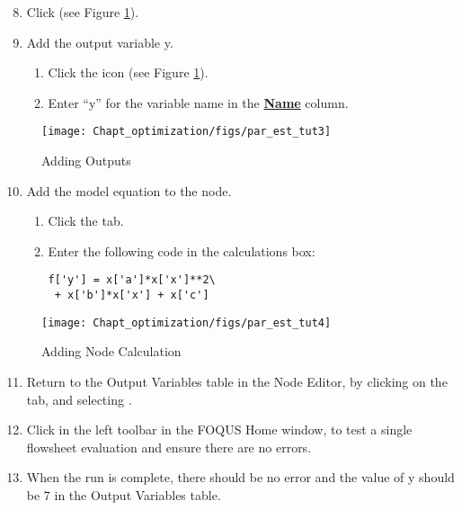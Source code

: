 \begin{enumerate}
	\setcounter{enumi}{7}
	\item Click  (see Figure \ref{fig.pe.tut3}).
	\item Add the output variable y.
	\begin{enumerate}
		\item Click the  icon (see Figure \ref{fig.pe.tut3}).
		\item Enter ``y'' for the variable name in the \textbf{\underline{Name}} column.
	\end{enumerate}
\end{enumerate}

\begin{figure}[H]
	\begin{center}
		\texttt{[image: Chapt\_optimization/figs/par\_est\_tut3]}
		\caption{Adding Outputs}
		\label{fig.pe.tut3}
	\end{center}
\end{figure}

\begin{enumerate}
	\setcounter{enumi}{9}
	\item Add the model equation to the node.
	\begin{enumerate}
		\item Click the  tab.
		\item Enter the following code in the calculations box:
		\begin{Verbatim}
f['y'] = x['a']*x['x']**2\
 + x['b']*x['x'] + x['c']
		\end{Verbatim}
	\end{enumerate}
\end{enumerate}

\begin{figure}[H]
	\begin{center}
		\texttt{[image: Chapt\_optimization/figs/par\_est\_tut4]}
		\caption{Adding Node Calculation}
		\label{fig.pe.tut4}
	\end{center}
\end{figure}

\begin{enumerate}
	\setcounter{enumi}{10}
	\item Return to the Output Variables table in the Node Editor, by clicking on the  tab, and selecting .
	\item Click \bu{Run} in the left toolbar in the FOQUS Home window, to test a single flowsheet evaluation and ensure there are no errors.
	\item When the run is complete, there should be no error and the value of y should be 7 in the Output Variables table.
\end{enumerate}

